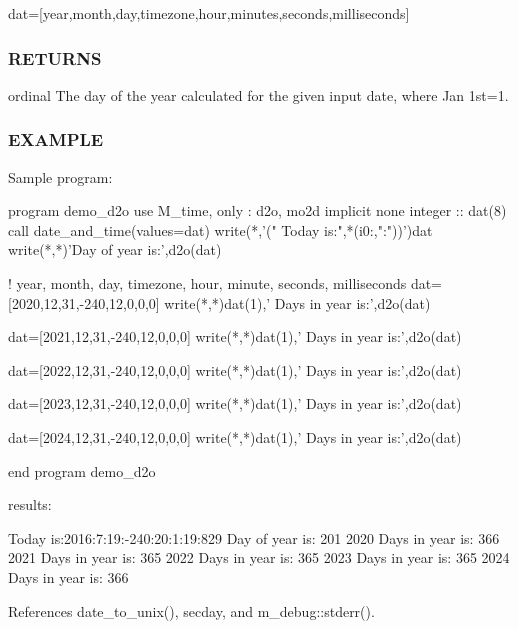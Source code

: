 dat=\mbox{[}year,month,day,timezone,hour,minutes,seconds,milliseconds\mbox{]} \subsubsection*{R\+E\+T\+U\+R\+NS}

ordinal The day of the year calculated for the given input date, where Jan 1st=1.

\subsubsection*{E\+X\+A\+M\+P\+LE}

\begin{DoxyVerb}Sample program:

 program demo_d2o
 use M_time, only : d2o, mo2d
 implicit none
 integer :: dat(8)
    call date_and_time(values=dat)
    write(*,'(" Today is:",*(i0:,":"))')dat
    write(*,*)'Day of year is:',d2o(dat)

    ! year, month, day, timezone, hour, minute, seconds, milliseconds
    dat=[2020,12,31,-240,12,0,0,0]
    write(*,*)dat(1),' Days in year is:',d2o(dat)

    dat=[2021,12,31,-240,12,0,0,0]
    write(*,*)dat(1),' Days in year is:',d2o(dat)

    dat=[2022,12,31,-240,12,0,0,0]
    write(*,*)dat(1),' Days in year is:',d2o(dat)

    dat=[2023,12,31,-240,12,0,0,0]
    write(*,*)dat(1),' Days in year is:',d2o(dat)

    dat=[2024,12,31,-240,12,0,0,0]
    write(*,*)dat(1),' Days in year is:',d2o(dat)

 end program demo_d2o

results:

 Today is:2016:7:19:-240:20:1:19:829
 Day of year is:         201
        2020  Days in year is:         366
        2021  Days in year is:         365
        2022  Days in year is:         365
        2023  Days in year is:         365
        2024  Days in year is:         366 \end{DoxyVerb}
 

References date\+\_\+to\+\_\+unix(), secday, and m\+\_\+debug\+::stderr().

\mbox{\label{namespacem__time_a1506e2889a156387df4481ed0534be81}} 
